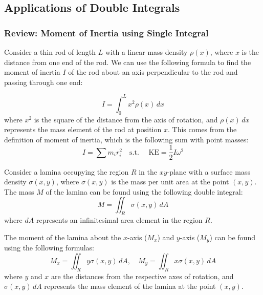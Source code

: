 \documentclass[11pt]{report}
\begin{document}
\subsection{Applications of Double Integrals}
\begin{shaded}
    \subsubsection*{Review: Moment of Inertia using Single Integral}

    Consider a thin rod of length $L$ with a linear mass density $\rho(x)$, where $x$ is the distance from one end of the rod. We can use the following formula to find the moment of inertia $I$ of the rod about an axis perpendicular to the rod and passing through one end:

    \begin{equation}
        I = \int_0^L x^2 \rho(x) \, dx
    \end{equation}
    where $x^2$ is the square of the distance from the axis of rotation, and $\rho(x) \, dx$ represents the mass element of the rod at position $x$. This comes from the definition of moment of inertia, which is the following sum with point masses:
    $$        
    I = \sum m_i r_i^2 \quad \text{s.t. } \quad \text{KE}= \frac{1}{2} I \omega^2
    $$
\end{shaded}

\begin{definition}
    Consider a lamina occupying the region $R$ in the $xy$-plane with a surface mass density $\sigma(x,y)$, where $\sigma(x,y)$ is the mass per unit area at the point $(x,y)$. The mass $M$ of the lamina can be found using the following double integral:
    \begin{equation}
        M = \iint_R \sigma(x,y) \, dA
    \end{equation}
    where $dA$ represents an infinitesimal area element in the region $R$.
    
\end{definition}

\begin{definition}
    The moment of the lamina about the $x$-axis ($M_x$) and $y$-axis ($M_y$) can be found using the following formulas:
    \begin{equation}
        M_x = \iint_R y \sigma(x,y) \, dA, \quad M_y = \iint_R x \sigma(x,y) \, dA
    \end{equation}
    where $y$ and $x$ are the distances from the respective axes of rotation, and $\sigma(x,y) \, dA$ represents the mass element of the lamina at the point $(x,y)$.
\end{definition}
\end{document}
